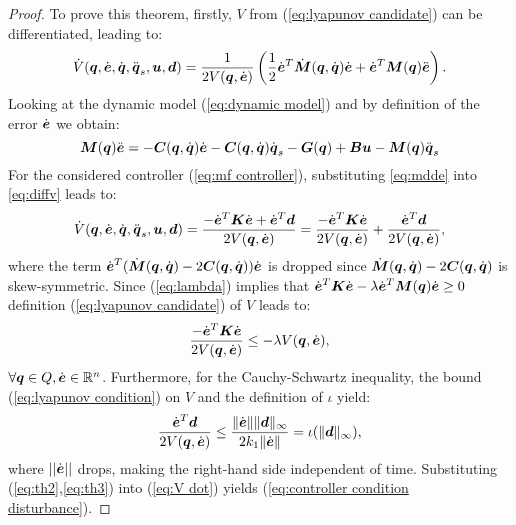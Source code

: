 \begin{proof}
    To prove this theorem, firstly,  $V$ from (\ref{eq:lyapunov candidate}) can be differentiated, leading to:
    \begin{equation}\label{eq:diffv}
        \dot{V}(\qv,\dot{\ev},\dot{\qv},\ddot{\qv}_s,\uv,\dv) = \frac{1}{2 V(\qv,\dot{\ev})} \left( \frac{1}{2}\dot{\ev}^T \dot{\Mm}(\qv, \dqv) \dot{\ev}+\dot{\ev}^T \Mm(\qv) \ddot{\ev} \right).
    \end{equation}
    Looking at the dynamic model (\ref{eq:dynamic model}) and by definition of the error $\dot{\ev}$ we obtain:
    \begin{equation}\label{eq:mdde}
     \Mm(\qv)\ddot{\ev}=-\Cm(\qv,\dot{\qv})\dot{\ev}-\Cm(\qv,\dot{\qv})\dot{\qv}_s-\Gm(\qv)+\Bm\uv-\Mm(\qv)\ddot{\qv}_s     
    \end{equation}
    For the considered controller (\ref{eq:mf controller}), substituting \eqref{eq:mdde} into \eqref{eq:diffv} leads to:
    \begin{equation} \label{eq:V dot}
        \dot{V}(\qv,\dot{\ev},\dot{\qv},\ddot{\qv}_s,\uv,\dv) = \frac{-\dot{\ev}^T \Km \dot{\ev} + \dot{\ev}^T \dv}{2 V(\qv,\dot{\ev})}=\frac{-\dot{\ev}^T \Km \dot{\ev}}{2 V(\qv,\dot{\ev})}+\frac{\dot{\ev}^T\dv}{2 V(\qv,\dot{\ev})},
    \end{equation}
    where the term $\dot{\ev}^T(\dot{\Mm}(\qv,\dot{\qv})-2\Cm(\qv,\dot{\qv}))\dot{\ev}$ is dropped since $\dot{\Mm}(\qv,\dot{\qv})-2\Cm(\qv,\dot{\qv})$ is skew-symmetric. 
    Since (\ref{eq:lambda}) implies that $\dot{\ev}^T \Km\dot{\ev}-\lambda \dot{\ev}^T \Mm(\qv) \dot{\ev} \geq 0$ definition (\ref{eq:lyapunov candidate}) of $V$ leads to:
    \begin{equation} \label{eq:th2}
        \frac{-\dot{\ev}^T \Km\dot{\ev}}{2V(\qv,\dot{\ev})}\leq -\lambda V(\qv,\dot{\ev}),  
    \end{equation}
    $\forall \qv \in Q, \dot{\ev} \in \mathbb{R}^n$. Furthermore, for the Cauchy-Schwartz inequality, the bound (\ref{eq:lyapunov condition}) on $V$ and the definition of $\iota$ yield:
    \begin{equation} \label{eq:th3}
        \frac{\dot{\ev}^T\dv}{2V(\qv,\dot{\ev})}\leq \frac{\lVert \dot{\ev}\rVert \lVert \dv \rVert _\infty}{2k_1\lVert \dot{\ev} \rVert}=\iota(\lVert \dv \rVert _\infty),
    \end{equation}
    where $||\dot{\ev}||$ drops, making the right-hand side independent of time. Substituting (\ref{eq:th2},\ref{eq:th3}) into (\ref{eq:V dot}) yields (\ref{eq:controller condition disturbance}).
\end{proof}